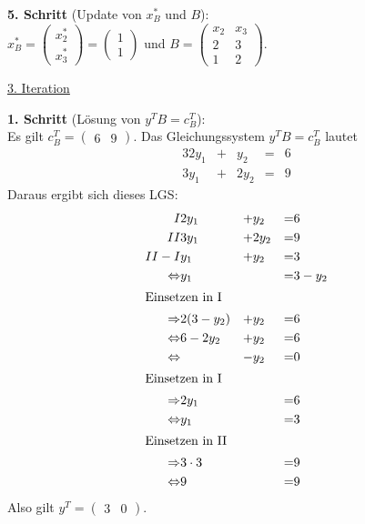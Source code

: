 \documentclass[10pt,a4paper,oneside,ngerman,numbers=noenddot]{scrartcl}
\begin{document}
		\textbf{5. Schritt} (Update von $x_{B}^{*}$ und $B$):\\
		$x_{B}^{*} = \begin{pmatrix} x_{2}^{*} \\ x_{3}^{*} \end{pmatrix} = \begin{pmatrix} 1 \\ 1 \end{pmatrix}$ und $B = \begin{pmatrix} x_{2} & x_{3} \\ 2 & 3 \\ 1 & 2 \end{pmatrix}$.
		
		\underline{3. Iteration}
		
		\textbf{1. Schritt} (Lösung von $y^{T}B = c_{B}^{T}$):\\
		Es gilt $c_{B}^{T} = \begin{pmatrix} 6 & 9 \end{pmatrix}$. Das Gleichungssystem $y^{T}B = c_{B}^{T}$ lautet
		\begin{alignat*}{3}
			2y_{1} &+& y_{2} &=& 6 \\
			3y_{1} &+& 2y_{2} &=& 9
		\end{alignat*}
		Daraus ergibt sich dieses LGS:
		\begin{alignat*}{3}
			I & 2y_{1} &+& y_{2} &=& 6 \\
			II & 3y_{1} &+& 2y_{2} &=& 9 \\
			II - I & y_{1} &+& y_{2} &=& 3 \\
			\Leftrightarrow & y_{1} && &=& 3 - y_{2} \\
			\intertext{Einsetzen in I}
			\Rightarrow & 2(3 - y_{2}) &+& y_{2} &=& 6 \\
			\Leftrightarrow & 6 - 2y_{2} &+& y_{2} &=& 6 \\
			\Leftrightarrow & &-& y_{2} &=& 0 \\
			\intertext{Einsetzen in I}
			\Rightarrow & 2y_{1} && &=& 6 \\
			\Leftrightarrow & y_{1} && &=& 3 \\
			\intertext{Einsetzen in II}
			\Rightarrow & 3 \cdot 3 && &=& 9 \\
			\Leftrightarrow & 9 && &=& 9
		\end{alignat*}
		Also gilt $y^{T} = \begin{pmatrix} 3 & 0 \end{pmatrix}$.
		
\end{document}
